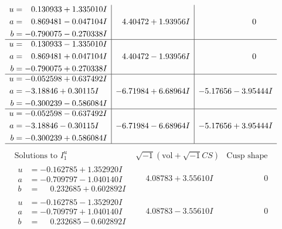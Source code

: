 \documentclass[1p]{elsarticle_modified}
\theoremstyle{definition}
\newcommand{\I}{\sqrt{-1}}
\begin{document}
$$\begin{array}{c|c|c}
\begin{aligned}
u &= \phantom{-}0.130933 + 1.335010 I \\
a &= \phantom{-}0.869481 - 0.047104 I \\
b &= -0.790075 - 0.270338 I\end{aligned}
 & \phantom{-}4.40472 + 1.93956 I & \phantom{-0.000000 } 0 \\ \hline\begin{aligned}
u &= \phantom{-}0.130933 - 1.335010 I \\
a &= \phantom{-}0.869481 + 0.047104 I \\
b &= -0.790075 + 0.270338 I\end{aligned}
 & \phantom{-}4.40472 - 1.93956 I & \phantom{-0.000000 } 0 \\ \hline\begin{aligned}
u &= -0.052598 + 0.637492 I \\
a &= -3.18846 + 0.30115 I \\
b &= -0.300239 - 0.586084 I\end{aligned}
 & -6.71984 + 6.68964 I & -5.17656 - 3.95444 I \\ \hline\begin{aligned}
u &= -0.052598 - 0.637492 I \\
a &= -3.18846 - 0.30115 I \\
b &= -0.300239 + 0.586084 I\end{aligned}
 & -6.71984 - 6.68964 I & -5.17656 + 3.95444 I\\
 \hline 
 \end{array}$$\newpage$$\begin{array}{c|c|c}  
\text{Solutions to }I^u_{1}& \I (\text{vol} + \sqrt{-1}CS) & \text{Cusp shape}\\
 \hline 
\begin{aligned}
u &= -0.162785 + 1.352920 I \\
a &= -0.709797 - 1.040140 I \\
b &= \phantom{-}0.232685 + 0.602892 I\end{aligned}
 & \phantom{-}4.08783 + 3.55610 I & \phantom{-0.000000 } 0 \\ \hline\begin{aligned}
u &= -0.162785 - 1.352920 I \\
a &= -0.709797 + 1.040140 I \\
b &= \phantom{-}0.232685 - 0.602892 I\end{aligned}
 & \phantom{-}4.08783 - 3.55610 I & \phantom{-0.000000 } 0 \\ \hline\begin{aligned}

\end{aligned}
\end{array}$$
\end{document}
